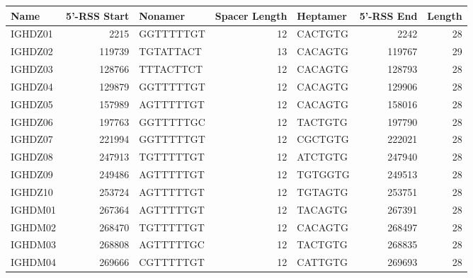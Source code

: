 \begin{tabular}{lrlrlrr}
  \toprule Name & 5'-RSS Start & Nonamer & Spacer Length & Heptamer & 5'-RSS End & Length \\ 
  \midrule IGHDZ01 & 2215 & GGTTTTTGT & 12 & CACTGTG & 2242 & 28 \\ 
  IGHDZ02 & 119739 & TGTATTACT & 13 & CACAGTG & 119767 & 29 \\ 
  IGHDZ03 & 128766 & TTTACTTCT & 12 & CACAGTG & 128793 & 28 \\ 
  IGHDZ04 & 129879 & GGTTTTTGT & 12 & CACAGTG & 129906 & 28 \\ 
  IGHDZ05 & 157989 & AGTTTTTGT & 12 & CACAGTG & 158016 & 28 \\ 
  IGHDZ06 & 197763 & GGTTTTTGC & 12 & TACTGTG & 197790 & 28 \\ 
  IGHDZ07 & 221994 & GGTTTTTGT & 12 & CGCTGTG & 222021 & 28 \\ 
  IGHDZ08 & 247913 & TGTTTTTGT & 12 & ATCTGTG & 247940 & 28 \\ 
  IGHDZ09 & 249486 & AGTTTTTGT & 12 & TGTGGTG & 249513 & 28 \\ 
  IGHDZ10 & 253724 & AGTTTTTGT & 12 & TGTAGTG & 253751 & 28 \\ 
  IGHDM01 & 267364 & AGTTTTTGT & 12 & TACAGTG & 267391 & 28 \\ 
  IGHDM02 & 268470 & TGTTTTTGT & 12 & CACAGTG & 268497 & 28 \\ 
  IGHDM03 & 268808 & AGTTTTTGC & 12 & TACTGTG & 268835 & 28 \\ 
  IGHDM04 & 269666 & CGTTTTTGT & 12 & CATTGTG & 269693 & 28 \\ 
   \bottomrule \end{tabular}
